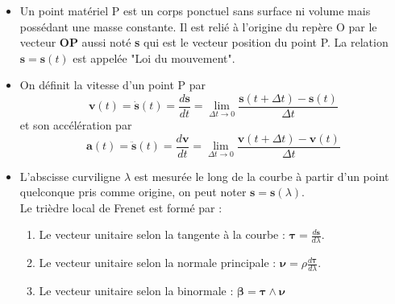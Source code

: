 \documentclass[a4paper]{article}
\begin{document}
\begin{itemize}









\item Un point matériel P est un corps ponctuel sans surface ni volume mais possédant une masse constante. Il est relié à l'origine du repère O par le vecteur \textbf{OP} aussi noté \textbf{s} qui est le vecteur position du point P. La relation $ \textbf{s} = \textbf{s}(t) $ est appelée "Loi du mouvement".





\item On définit la vitesse d'un point P par 
\[ \textbf{v}(t) = \dot{\textbf{s}}(t) = \frac{d \textbf{s}}{d t} = \lim_{\Delta t \to 0} \frac{\textbf{s}(t + \Delta t) - \textbf{s}(t)}{\Delta t} \]
et son accélération par 
\[ \textbf{a}(t) = \ddot{\textbf{s}}(t) = \frac{d \textbf{v}}{d t} = \lim_{\Delta t \to 0} \frac{\textbf{v}(t + \Delta t) - \textbf{v}(t)}{\Delta t} \]





\item L'abscisse curviligne $ \lambda $ est mesurée le long de la courbe à partir d'un point quelconque pris comme origine, on peut noter $ \textbf{s} = \textbf{s}(\lambda) $. \\
Le trièdre local de Frenet est formé par : 
\begin{enumerate}
\item Le vecteur unitaire selon la tangente à la courbe : $\displaystyle \boldsymbol{\tau} = \frac{d \textbf{s}}{d \lambda} $.
\item Le vecteur unitaire selon la normale principale : $\displaystyle \boldsymbol{\nu} = \rho \frac{d \boldsymbol{\tau}}{d \lambda} $.
\item Le vecteur unitaire selon la binormale : $\displaystyle \boldsymbol{\beta} = \boldsymbol{\tau} \wedge \boldsymbol{\nu} $
\end{enumerate}






\end{itemize}
\end{document}
